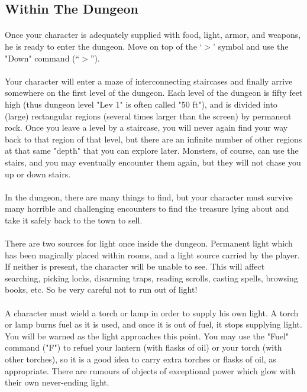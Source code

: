 \subsection{Within The Dungeon}
\paragraph{}Once your character is adequately supplied with food, light, armor, and
weapons, he is ready to enter the dungeon. Move on top of the `$>$' symbol
and use the "Down" command (``$>$'').

\paragraph{}Your character will enter a maze of interconnecting staircases and finally
arrive somewhere on the first level of the dungeon. Each level of the
dungeon is fifty feet high (thus dungeon level "Lev 1" is often called
"50 ft"), and is divided into (large) rectangular regions (several times
larger than the screen) by permanent rock. Once you leave a level by a
staircase, you will never again find your way back to that region of that
level, but there are an infinite number of other regions at that same "depth"
that you can explore later. Monsters, of course, can use the stairs,
and you may eventually encounter them again, but they will not chase you up
or down stairs.

\paragraph{}In the dungeon, there are many things to find, but your
character must survive many horrible and challenging encounters to find
the treasure lying about and take it safely back to the town to sell.

\paragraph{}There are two sources for light once inside the dungeon.
Permanent light which has been magically placed within rooms, and a
light source carried by the player. If neither is present, the character
will be unable to see.  This will affect searching, picking locks,
disarming traps, reading scrolls, casting spells, browsing books, etc.
So be very careful not to run out of light!

\paragraph{}A character must wield a torch or lamp in order to supply
his own light. A torch or lamp burns fuel as it is used, and once it is
out of fuel, it stops supplying light. You will be warned as the light
approaches this point.  You may use the "Fuel" command ("F") to refuel
your lantern (with flasks of oil) or your torch (with other torches), so
it is a good idea to carry extra torches or flasks of oil, as
appropriate. There are rumours of objects of exceptional power which
glow with their own never-ending light.

